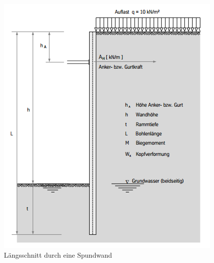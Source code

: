 \documentclass[11pt,fleqn,a4paper,halfparskip]{article}
\begin{document}
\begin{figure}[h!]
\includegraphics[scale=0.4]{Spundwandlangs.png}
\caption{Längsschnitt durch eine Spundwand \cite[1.6 S.10]{spund}}
\end{figure}
\newpage
\end{document}
